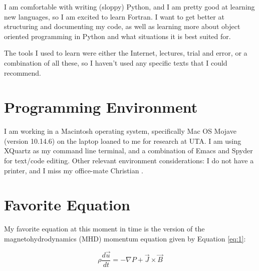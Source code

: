 \documentclass[12pt, letterpaper]{article}
\begin{document}
I am comfortable with writing (sloppy) Python, and I am pretty good at learning new languages, so I am excited to learn Fortran. I want to get better at structuring and documenting my code, as well as learning more about object oriented programming in Python and what situations it is best suited for.

The tools I used to learn were either the Internet, lectures, trial and error, or a combination of all these, so I haven't used any specific texts that I could recommend.

\section{Programming Environment}


I am working in a Macintosh operating system, specifically Mac OS Mojave (version 10.14.6) on the laptop loaned to me for research at UTA. I am using XQuartz as my command line terminal, and a combination of Emacs and Spyder for text/code editing. Other relevant environment considerations: I do not have a printer, and I miss my office-mate Christian \frownie{}.

\section{Favorite Equation}


My favorite equation at this moment in time is the version of the magnetohydrodynamics (MHD) momentum equation given by Equation \ref{eq:1}:

\begin{equation}
  \label{eq:1}
  \rho \frac{d \vec{u}}{dt} = - \nabla P + \vec{J} \times \vec{B}
\end{equation}
\end{document}
